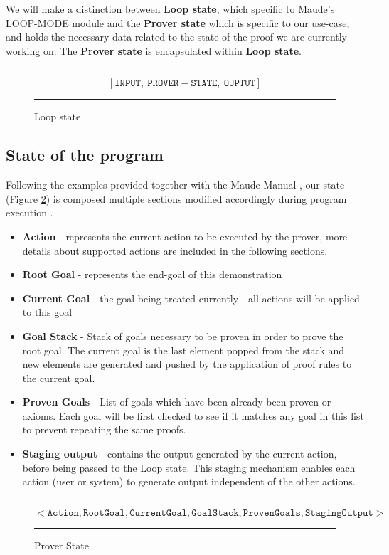 \documentclass[12pt,a4paper]{article}
\begin{document}
We will make a distinction between \textbf{Loop state}, which specific to Maude's LOOP-MODE module and the \textbf{Prover state} which is specific to our use-case, and holds the necessary data related to the state of the proof we are currently working on. The \textbf{Prover state} is encapsulated within \textbf{Loop state}.
\begin{figure}[h]
	\noindent\rule{\linewidth}{0.4pt}

	\[
		[\mathtt{INPUT},\ \mathtt{PROVER-STATE},\ \mathtt{OUPTUT}]
	\]
	\label{fig:loopState}
	\caption{Loop state}
	\noindent\rule{\linewidth}{0.4pt}
\end{figure}
\subsection{State of the program}
Following the examples provided together with the Maude Manual \cite{manual}, our state (Figure \ref{fig:ProverState}) is composed multiple sections modified accordingly during program execution .
\begin{itemize}
	\item{\textbf{Action} - represents the current action to be executed by the prover, more details about supported actions are included in the following sections.}
	\item{\textbf{Root Goal} - represents the end-goal of this demonstration}
	\item{\textbf{Current Goal} - the goal being treated currently - all actions will be applied to this goal}
	\item{\textbf{Goal Stack} - Stack of goals necessary to be proven in order to prove the root goal. The current goal is the last element popped from the stack and new elements are generated and pushed by the application of proof rules to the current goal.}
	\item{\textbf{Proven Goals} - List of goals which have been already been proven or axioms. Each goal will be first checked to see if it matches any goal in this list to prevent repeating the same proofs.}
	\item{\textbf{Staging output} - contains the output generated by the current action, before being passed to the Loop state. This staging mechanism enables each action (user or system) to generate output independent of the other actions.}
\end{itemize}
\begin{figure}[h]
	\noindent\rule{\linewidth}{0.4pt}
	\(
	< \mathtt{Action}, \mathtt{Root Goal}, \mathtt{Current Goal}, \mathtt{Goal Stack}, \mathtt{Proven Goals}, \mathtt{Staging Output} >
	\)
	\caption{Prover State}
	\label{fig:ProverState}
	\noindent\rule{\linewidth}{0.4pt}
\end{figure}
\end{document}
